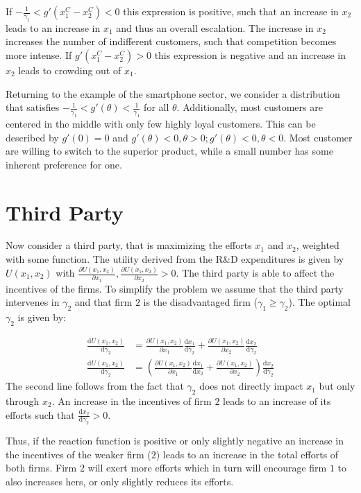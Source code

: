 \documentclass[a4paper, 11pt]{article}
\renewcommand{\d}{\text{d}}
\begin{document}
If $-\frac{1}{\gamma_1}<g'(x_1^C-x_2^C)<0$ this expression is positive, such that an increase in $x_2$ leads to an increase in $x_1$ and thus an overall escalation. The increase in $x_2$ increases the number of indifferent customers, such that competition becomes more intense. If $g'(x_1^C-x_2^C)>0$ this expression is negative and an increase in $x_2$ leads to crowding out of $x_1$. 

Returning to the example of the smartphone sector, we consider a distribution that satisfies $-\frac{1}{\gamma_1}<g'(\theta)<\frac{1}{\gamma_1}$ for all $\theta$. Additionally, most customers are centered in the middle with only few highly loyal customers. This can be described by $g'(0)=0$ and $g'(\theta)<0, \theta>0; g'(\theta)<0, \theta<0$. Most customer are willing to switch to the superior product, while a small number has some inherent preference for one.

\section{Third Party}

Now consider a third party, that is maximizing the efforts $x_1$ and $x_2$, weighted with some function. The utility derived from the R\&D expenditures is given by $U(x_1,x_2)$ with $\frac{\partial U(x_1,x_2)}{\partial x_1},\frac{\partial U(x_1,x_2)}{\partial x_2}>0$. The third party is able to affect the incentives of the firms. To simplify the problem we assume that the third party intervenes in $\gamma_2$ and that firm $2$ is the disadvantaged firm ($\gamma_1\geq\gamma_2$). The optimal $\gamma_2$ is given by:

\begin{align}
\frac{\d U(x_1,x_2)}{\d \gamma_2} &= \frac{\partial U(x_1,x_2)}{\partial x_1}\frac{\d x_1}{\d \gamma_2} + \frac{\partial U(x_1,x_2)}{\partial x_2}\frac{\d x_2}{\d \gamma_2}\\
\frac{\d U(x_1,x_2)}{\d \gamma_2} &= \left(\frac{\partial U(x_1,x_2)}{\partial x_1}\frac{\d x_1}{\d x_2}+ \frac{\partial U(x_1,x_2)}{\partial x_2}\right)\frac{\d x_2}{\d \gamma_2}
\end{align}
The second line follows from the fact that $\gamma_2$ does not directly impact $x_1$ but only through $x_2$. An increase in the incentives of firm $2$ leads to an increase of its efforts such that $\frac{\d x_2}{\d \gamma_2}>0$. 

Thus, if the reaction function is positive or only slightly negative an increase in the incentives of the weaker firm ($2$) leads to an increase in the total efforts of both firms. Firm $2$ will exert more efforts which in turn will encourage firm $1$ to also increases hers, or only slightly reduces its efforts. 
\end{document}
